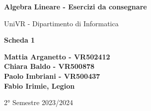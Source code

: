 \begin{titlepage}
	\begin{center}
		\vspace*{1cm}

		\Huge
		\textbf{Algebra Lineare - Esercizi da consegnare}

		\vspace{0.5cm}
		\LARGE
		UniVR - Dipartimento di Informatica

		\vspace{1cm}
		\huge
		\textbf{Scheda 1}
		\vspace{1.5cm}


		\vfill


		\vspace{0.8cm}

		\Large
		\textbf{Mattia Arganetto - VR502412}\\
		\textbf{Chiara Baldo - VR500878}\\
		\textbf{Paolo Imbriani - VR500437}\\
		\textbf{Fabio Irimie, Legion}

		\vspace{0.5cm}

		2° Semestre 2023/2024

	\end{center}
\end{titlepage}
